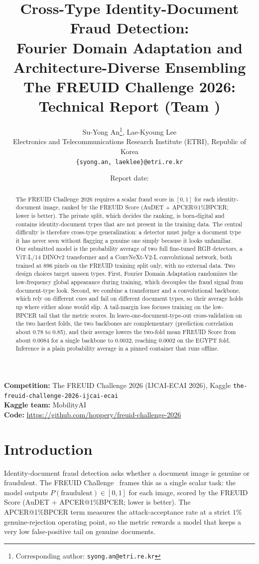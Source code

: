 \documentclass[11pt,a4paper]{article}
\title{%
  \textbf{Cross-Type Identity-Document Fraud Detection:\\
  Fourier Domain Adaptation and Architecture-Diverse Ensembling}\\[0.5em]
  \large The FREUID Challenge 2026: Technical Report (Team \teamname)
}
\author{%
  Su-Yong An\thanks{Corresponding author: \texttt{syong.an@etri.re.kr}},
  \enspace Lae-Kyoung Lee\\
  \small
  Electronics and Telecommunications Research Institute (ETRI), Republic of Korea\\
  \texttt{\{syong.an,\,laeklee\}@etri.re.kr}
}
\date{Report date: \reportdate}
\newcommand{\kaggleteam}{MobilityAI}
\begin{document}
\maketitle

\begin{abstract}
The FREUID Challenge 2026 requires a scalar fraud score in $[0,1]$ for each identity-document image, ranked
by the FREUID Score (AuDET $+$ APCER@1\%BPCER; lower is better). The private split, which decides the
ranking, is born-digital and contains identity-document types that are not present in the training data. The
central difficulty is therefore cross-type generalization: a detector must judge a document type it has never
seen without flagging a genuine one simply because it looks unfamiliar. Our submitted model is the
probability average of two full fine-tuned RGB detectors, a ViT-L/14 DINOv2 transformer and a ConvNeXt-V2-L
convolutional network, both trained at 896 pixels on the FREUID training split only, with no external data.
Two design choices target unseen types. First, Fourier Domain Adaptation randomizes the low-frequency global
appearance during training, which decouples the fraud signal from document-type look. Second, we combine a
transformer and a convolutional backbone, which rely on different cues and fail on different document types,
so their average holds up where either alone would slip. A tail-margin loss focuses training on the
low-BPCER tail that the metric scores. In leave-one-document-type-out cross-validation on the two hardest
folds, the two backbones are complementary (prediction correlation about 0.78 to 0.85), and their average
lowers the two-fold mean FREUID Score from about 0.0084 for a single backbone to 0.0032, reaching 0.0002 on
the EGYPT fold. Inference is a plain probability average in a pinned container that runs offline.
\end{abstract}

\noindent\textbf{Competition:} The FREUID Challenge 2026 (IJCAI-ECAI 2026), Kaggle
\texttt{the-freuid-challenge-2026-ijcai-ecai}~\cite{freuid2026}\\
\textbf{Kaggle team:} \kaggleteam\\
\textbf{Code:} \url{https://github.com/hoppery/freuid-challenge-2026}\\

\section{Introduction}
\label{sec:intro}
Identity-document fraud detection asks whether a document image is genuine or fraudulent. The FREUID
Challenge~\cite{freuid2026} frames this as a single scalar task: the model outputs
$P(\text{fraudulent})\in[0,1]$ for each image, scored by the FREUID Score (AuDET $+$ APCER@1\%BPCER; lower is
better). The APCER@1\%BPCER term measures the attack-acceptance rate at a strict $1\%$ genuine-rejection
operating point, so the metric rewards a model that keeps a very low false-positive tail on genuine
documents.
\end{document}
